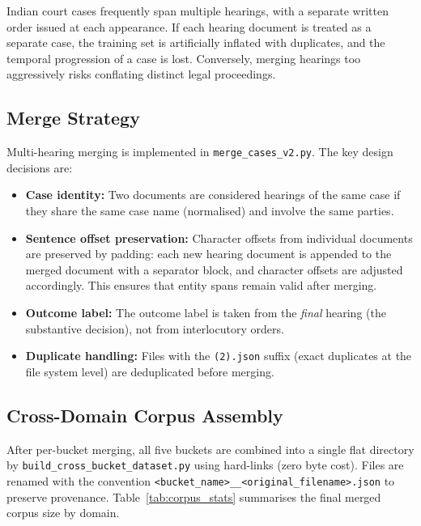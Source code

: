 \documentclass[12pt,a4paper]{report}
\begin{document}
Indian court cases frequently span multiple hearings, with a separate written order issued at each appearance. If each hearing document is treated as a separate case, the training set is artificially inflated with duplicates, and the temporal progression of a case is lost. Conversely, merging hearings too aggressively risks conflating distinct legal proceedings.

\subsection{Merge Strategy}

Multi-hearing merging is implemented in \texttt{merge\_cases\_v2.py}. The key design decisions are:

\begin{itemize}
  \item \textbf{Case identity:} Two documents are considered hearings of the same case if they share the same case name (normalised) and involve the same parties.
  \item \textbf{Sentence offset preservation:} Character offsets from individual documents are preserved by padding: each new hearing document is appended to the merged document with a separator block, and character offsets are adjusted accordingly. This ensures that entity spans remain valid after merging.
  \item \textbf{Outcome label:} The outcome label is taken from the \textit{final} hearing (the substantive decision), not from interlocutory orders.
  \item \textbf{Duplicate handling:} Files with the \texttt{(2).json} suffix (exact duplicates at the file system level) are deduplicated before merging.
\end{itemize}

\subsection{Cross-Domain Corpus Assembly}

After per-bucket merging, all five buckets are combined into a single flat directory by \texttt{build\_cross\_bucket\_dataset.py} using hard-links (zero byte cost). Files are renamed with the convention \texttt{<bucket\_name>\_\_<original\_filename>.json} to preserve provenance. Table~\ref{tab:corpus_stats} summarises the final merged corpus size by domain.
\end{document}
